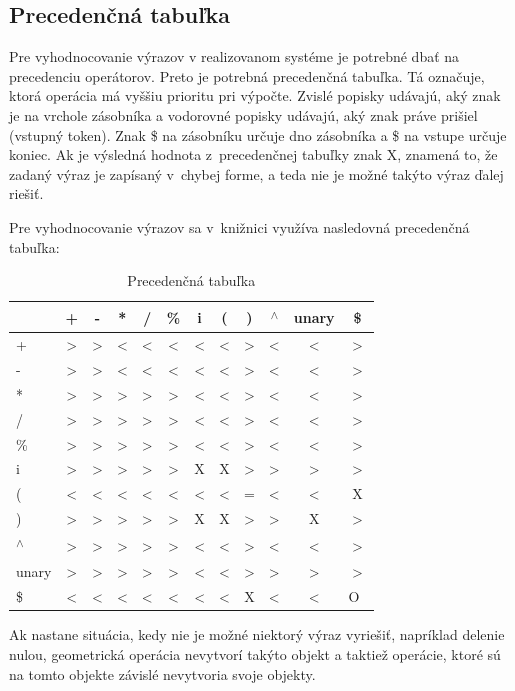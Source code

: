 \subsection*{Precedenčná tabuľka}
Pre vyhodnocovanie výrazov v realizovanom systéme je potrebné dbať na precedenciu operátorov. Preto je potrebná precedenčná tabuľka. Tá označuje, ktorá operácia má vyššiu prioritu pri výpočte. Zvislé popisky udávajú, aký znak je na vrchole zásobníka a vodorovné popisky udávajú, aký znak práve prišiel (vstupný token). Znak \$ na zásobníku určuje dno zásobníka a \$ na vstupe určuje koniec. Ak je výsledná hodnota z~precedenčnej tabuľky znak X, znamená to, že zadaný výraz je zapísaný v~chybej forme, a teda nie je možné takýto výraz ďalej riešiť.

Pre vyhodnocovanie výrazov sa v~knižnici využíva nasledovná precedenčná tabuľka: \nopagebreak
\begin{table}[H]
\centering
\begin{tabular}{ |m{1cm}||c c c c c c c c c c c |}
\hline
&+ & - & * & / & \% & i & ( & ) & \textsuperscript{$\wedge$} & unary & \$   \\
\hline
\hline
+ & > & > & < & < & < & < & < & > & < & < & >          \\
- & > & > & < & < & < & < & < & > & < & < & >          \\
* & > & > & > & > & > & < & < & > & < & < & >          \\
/ & > & > & > & > & > & < & < & > & < & < & >          \\
\% & > & > & > & > & > & < & < & > & < & < & >          \\
i & > & > & > & > & > & X & X & > & > & > & >          \\
( & < & < & < & < & < & < & < & = & < & < & X          \\
) & > & > & > & > & > & X & X & > & > & X & >          \\
\textsuperscript{$\wedge$} & > & > & > & > & > & < & < & > & < & < & > \\
unary & > & > & > & > & > & < & < & > & > & > & >      \\
\$ & < & < & < & < & < & < & < & X & < & < & O~\\
\hline
\end{tabular}
\caption{\label{tab:precedenceTable}Precedenčná tabuľka}
\end{table}


Ak nastane situácia, kedy nie je možné niektorý výraz vyriešiť, napríklad delenie nulou, geometrická operácia nevytvorí takýto objekt a taktiež operácie, ktoré sú na tomto objekte závislé nevytvoria svoje objekty.

